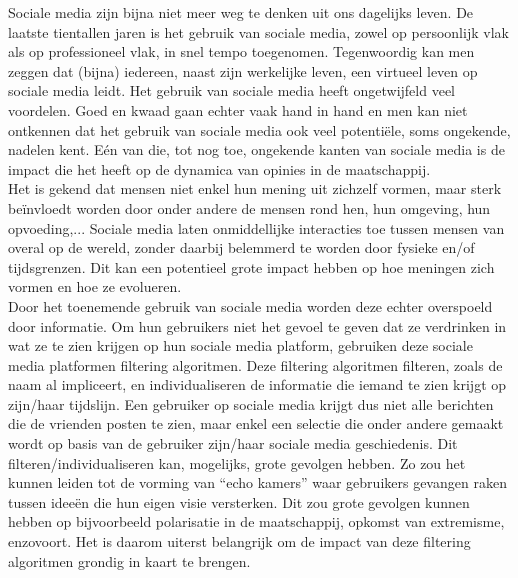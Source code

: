 \documentclass[11 pt , letterpaper , twoside , openright]{book}
\newenvironment{abstract}%
{\cleardoublepage\null \vfill\begin{center}\bfseries \abstractname \end{center}}{\vfill\null}
\begin{document}
\begin{abstract}
\end{abstract}

\begin{abstract}
Sociale media zijn bijna niet meer weg te denken uit ons dagelijks leven. De laatste tientallen jaren is het gebruik van sociale media, zowel op persoonlijk vlak als op professioneel vlak, in snel tempo toegenomen. Tegenwoordig kan men zeggen dat (bijna) iedereen, naast zijn werkelijke leven, een virtueel leven op sociale media leidt. Het gebruik van sociale media heeft ongetwijfeld veel voordelen. Goed en kwaad gaan echter vaak hand in hand en men kan niet ontkennen dat het gebruik van sociale media ook veel potentiële, soms ongekende, nadelen kent. Eén van die, tot nog toe, ongekende kanten van sociale media is de impact die het heeft op de dynamica van opinies in de maatschappij. \\
Het is gekend dat mensen niet enkel hun mening uit zichzelf vormen, maar sterk beïnvloedt worden door onder andere de mensen rond hen, hun omgeving, hun opvoeding,... Sociale media laten onmiddellijke interacties toe tussen mensen van overal op de wereld, zonder daarbij belemmerd te worden door fysieke en/of tijdsgrenzen. Dit kan een potentieel grote impact hebben op hoe meningen zich vormen en hoe ze evolueren.\\
Door het toenemende gebruik van sociale media worden deze echter overspoeld door informatie. Om hun gebruikers niet het gevoel te geven dat ze verdrinken in wat ze te zien krijgen op hun sociale media platform, gebruiken deze sociale media platformen  filtering algoritmen. Deze filtering algoritmen filteren, zoals de naam al impliceert, en individualiseren de informatie die iemand te zien krijgt op zijn/haar tijdslijn. Een gebruiker op sociale media krijgt dus niet alle berichten die de vrienden posten te zien, maar enkel een selectie die onder andere gemaakt wordt op basis van de gebruiker zijn/haar sociale media geschiedenis. Dit filteren/individualiseren kan, mogelijks, grote gevolgen hebben. Zo zou het kunnen leiden tot de vorming van  ``echo kamers'' waar gebruikers gevangen raken tussen ideeën die hun eigen visie versterken. Dit zou grote gevolgen kunnen hebben op bijvoorbeeld polarisatie in de maatschappij, opkomst van extremisme, enzovoort. Het is daarom uiterst belangrijk om de impact van deze filtering algoritmen grondig in kaart te brengen.\\

\end{abstract}
\end{document}
